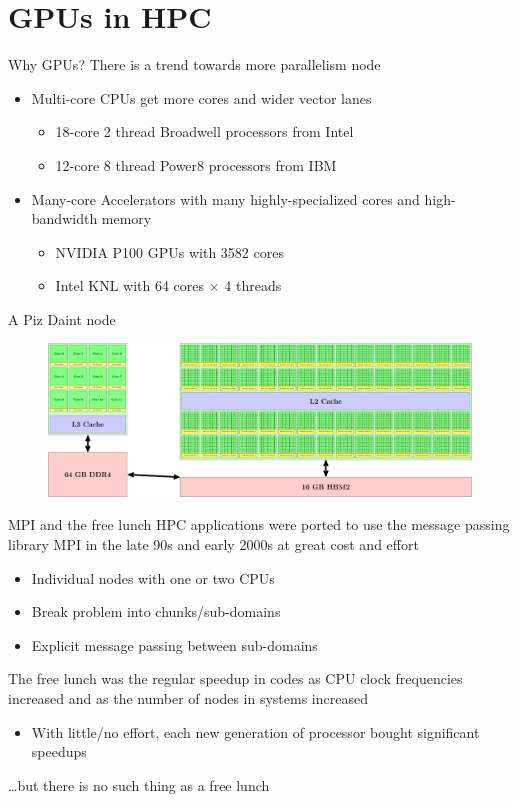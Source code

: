 \documentclass[aspectratio=169,12pt]{beamer}
\begin{document}
\part{GPUs in HPC}

\begin{frame}{Why GPUs?}
  There is a trend towards more parallelism node
  \vfill
  \begin{itemize}
    \item Multi-core CPUs get more cores and wider vector lanes
      \begin{itemize}
      \item 18-core 2 thread Broadwell processors from Intel
      \item 12-core 8 thread Power8 processors from IBM
      \end{itemize}
    \item Many-core Accelerators with many highly-specialized cores and high-bandwidth memory
      \begin{itemize}
      \item NVIDIA P100 GPUs with 3582 cores
      \item Intel KNL with 64 cores $\times$ 4 threads
      \end{itemize}
  \end{itemize}
\end{frame}

\begin{frame}{A Piz Daint node}
  \begin{figure}
    \centering
    \includegraphics[width=\textwidth]{pizdaint_node}
  \end{figure}
\end{frame}

\begin{frame}{MPI and the free lunch}
  HPC applications were ported to use the message passing library MPI in the late 90s and early 2000s at great cost and effort
  \begin{itemize}
  \item Individual nodes with one or two CPUs
  \item Break problem into chunks/sub-domains
  \item Explicit message passing between sub-domains
  \end{itemize}

  The free lunch was the regular speedup in codes as CPU clock frequencies increased and as the number of nodes in systems increased
  \begin{itemize}
  \item With little/no effort, each new generation of processor bought significant speedups
  \end{itemize}
  \dots but there is no such thing as a free lunch
\end{frame}
\end{document}

